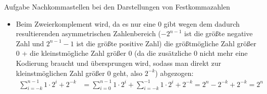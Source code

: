 \begin{frame}[allowframebreaks]{Aufgabe \thesection}{Nachkommastellen bei den Darstellungen von Festkommazahlen}
    \begin{Sidenote}
        \begin{itemize}
            \item  Beim \alert{Zweierkomplement} wird, da es nur eine $0$ gibt wegen dem dadurch resultierenden asymmetrischen Zahlenbereich ($-2^{n-1}$ ist die größte negative Zahl und $2^{n-1}-1$ ist die größte positive Zahl) die größtmögliche Zahl größer $0$ + die kleinstmögliche Zahl größer $0$ (da die zusätzliche $0$ nicht mehr eine Kodierung braucht und übersprungen wird, sodass man direkt zur kleinstmöglichen Zahl größer $0$ geht, also $2^{-k}$) abgezogen:
            \begin{align*}
            \sum_{i=-k}^{n-1}1\cdot2^{i} + 2^{-k} &= \sum_{i=0}^{n-1}1\cdot2^{i} + \sum_{i=-k}^{-1}1\cdot2^{i} + 2^{-k} = 2^n-2^{-k} + 2^{-k} = 2^n
            \end{align*}
        \end{itemize}
    \end{Sidenote}
\end{frame}